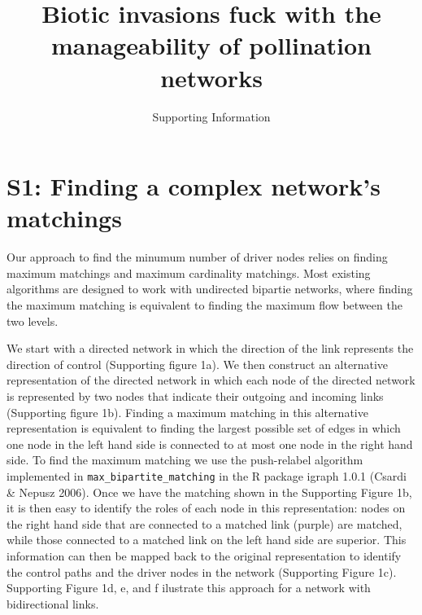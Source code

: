 \documentclass[a4paper]{artikel1}
\title{Biotic invasions fuck with the manageability of pollination networks}
\subtitle{Supporting Information}
\author{}
\date{}
\begin{document}
\maketitle

\doublespacing

\section{S1: Finding a complex network's
matchings}\label{s1-finding-a-complex-networks-matchings}

Our approach to find the minumum number of driver nodes relies on
finding maximum matchings and maximum cardinality matchings. Most
existing algorithms are designed to work with undirected bipartie
networks, where finding the maximum matching is equivalent to finding
the maximum flow between the two levels.

We start with a directed network in which the direction of the link
represents the direction of control (Supporting figure 1a). We then
construct an alternative representation of the directed network in which
each node of the directed network is represented by two nodes that
indicate their outgoing and incoming links (Supporting figure 1b).
Finding a maximum matching in this alternative representation is
equivalent to finding the largest possible set of edges in which one
node in the left hand side is connected to at most one node in the right
hand side. To find the maximum matching we use the push-relabel
algorithm implemented in \texttt{max\_bipartite\_matching} in the R
package igraph 1.0.1 (Csardi \& Nepusz 2006). Once we have the matching
shown in the Supporting Figure 1b, it is then easy to identify the roles
of each node in this representation: nodes on the right hand side that
are connected to a matched link (purple) are matched, while those
connected to a matched link on the left hand side are superior. This
information can then be mapped back to the original representation to
identify the control paths and the driver nodes in the network
(Supporting Figure 1c). Supporting Figure 1d, e, and f ilustrate this
approach for a network with bidirectional links.
\end{document}
